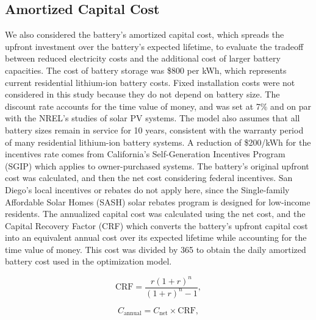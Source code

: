 \documentclass[14pt, final,numbered]{ifacconf}
\begin{document}
\subsection{Amortized Capital Cost}
We also considered the battery's amortized capital cost, which spreads the upfront investment over the battery's expected lifetime, to evaluate the tradeoff between reduced electricity costs and the additional cost of larger battery capacities. The cost of battery storage was \$800 per kWh, which represents current residential lithium-ion battery costs. Fixed installation costs were not considered in this study because they do not depend on battery size. The discount rate accounts for the time value of money, and was set at 7\% and on par with the NREL's studies of solar PV systems. The model also assumes that all battery sizes remain in service for 10 years, consistent with the warranty period of many residential lithium-ion battery systems. A reduction of \$200/kWh for the incentives rate comes from California's Self-Generation Incentives Program (SGIP) which applies to owner-purchased systems. The battery's original upfront cost was calculated, and then the net cost considering federal incentives. San Diego's local incentives or rebates do not apply here, since the Single-family Affordable Solar Homes (SASH) solar rebates program is designed for low-income residents. The annualized capital cost was calculated using the net cost, and the Capital Recovery Factor (CRF) which converts the battery's upfront capital cost into an equivalent annual cost over its expected lifetime while accounting for the time value of money. This cost was divided by 365 to obtain the daily amortized battery cost used in the optimization model.

\begin{equation}
\mathrm{CRF} =
\frac{r(1+r)^n}{(1+r)^n-1},
\end{equation}

\begin{equation}
C_{\mathrm{annual}}
=
C_{\mathrm{net}}
\times
\mathrm{CRF},
\end{equation}
\end{document}
